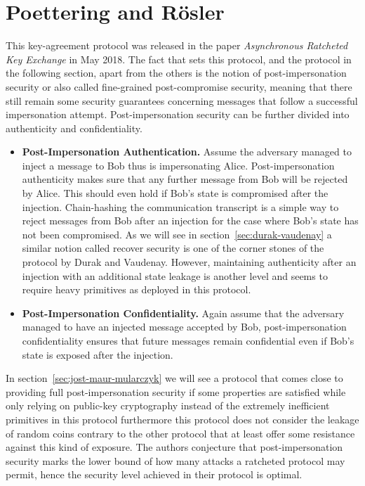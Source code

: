 \documentclass[11pt,a4paper,twoside,openright,bibliography=totoc]{scrbook}
\begin{document}
\section[Poettering and Rösler]
{Poettering and Rösler~\cite{poettering2018towards}}
\label{sec:poettering-roesler}

This key-agreement protocol was released in the paper
\textit{Asynchronous Ratcheted Key Exchange} in May 2018.
The fact that sets this protocol, and the protocol in the following
section, apart from the others is the notion of post-impersonation security or
also called fine-grained post-compromise security,
meaning that there still remain some security guarantees concerning
messages that follow a successful
impersonation attempt. Post-impersonation security can be further divided
into authenticity and confidentiality.
\begin{itemize}
\item \textbf{Post-Impersonation Authentication.} Assume the adversary
  managed to inject a message to Bob thus is impersonating Alice.
  Post-impersonation authenticity makes sure that any further message
  from Bob will be rejected by Alice. This should even hold if
  Bob's state is compromised after the injection. Chain-hashing
  the communication transcript is a simple way to reject messages from
  Bob after an injection for the case where Bob's state has not
  been compromised. As we will see in section~\ref{sec:durak-vaudenay}
  a similar notion called recover security is one of the corner stones
  of the protocol by Durak and Vaudenay. However, maintaining authenticity
  after an injection with an additional state leakage is another level
  and seems to require heavy primitives as deployed in this protocol.
\item \textbf{Post-Impersonation Confidentiality.} Again assume
  that the adversary managed to have an injected message accepted by Bob,
  post-impersonation confidentiality ensures that future messages remain
  confidential even if Bob's state is exposed after the injection.
\end{itemize}
In section~\ref{sec:jost-maur-mularczyk} we will see a protocol
that comes close to providing full post-impersonation security
if some properties are satisfied while only relying on
public-key cryptography instead of the extremely inefficient
primitives in this protocol furthermore this protocol
does not consider the leakage of random coins contrary to
the other protocol that at least offer some resistance against
this kind of exposure. The authors conjecture that
post-impersonation security marks the lower bound
of how many attacks a ratcheted protocol may permit, hence
the security level achieved in their protocol is optimal.
\end{document}
